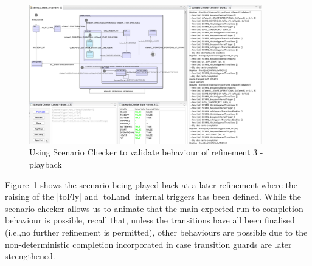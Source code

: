 \begin{figure}[!th]
\centering
\includegraphics[width=0.90\textwidth, trim=30 50 60 0]{figures/scenarioChecker_playback_drone3.png}
\caption{Using Scenario Checker to validate behaviour of refinement 3 - playback}
\label{fig:scenarioCheckerPlaybackDrone3}
\end{figure}

Figure~\ref{fig:scenarioCheckerPlaybackDrone3} shows the scenario being played back at a later refinement where the raising of the |toFly| and |toLand| internal triggers has been defined. 
While the scenario checker allows us to animate that the main expected run to completion behaviour is possible, recall that, unless the transitions have all been finalised (i.e.,no further refinement is permitted),  other behaviours are possible due to the non-deterministic completion incorporated in case transition guards are later strengthened. 
 

